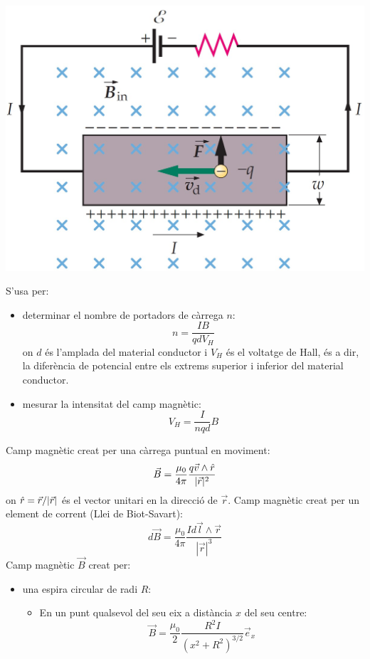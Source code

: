 \documentclass[../../../main.tex]{subfiles}
\begin{document}
\begin{multicols}{2}
\begin{minipage}{\linewidth}
\end{minipage}
\begin{minipage}{\linewidth}
    \centering
    \includegraphics[width=\linewidth]{Physics/1st/Electricity_and_magnetism/Images/hall-.jpg} 
\end{minipage}
S'usa per:
\begin{itemize}
    \item determinar el nombre de portadors de càrrega $n$: $$n=\frac{IB}{qdV_H}$$ {on $d$ és l'amplada del material conductor i $V_H$ és el voltatge de Hall, és a dir, la di\-fe\-rèn\-ci\-a de potencial entre els extrems superior i inferior del material conductor.}
    \item mesurar la intensitat del camp mag\-nè\-tic: $$V_H=\frac{I}{nqd}B$$
\end{itemize}
Camp magnètic creat per una càrrega puntual en moviment: $$\Vec{B}=\frac{\mu_0}{4\pi}\frac{q\Vec{v}\wedge\Hat{r}}{|\Vec{r}|^2}$$ {on $\Hat{r}=\Vec{r}/|\Vec{r}|$ és el vector unitari en la direcció de $\Vec{r}$.}\newline
Camp magnètic creat per un element de corrent (Llei de Biot-Savart): $$d\Vec{B}=\frac{\mu_0}{4\pi}\frac{Id\Vec{l}\wedge\Vec{r}}{|\Vec{r}|^3}$$
Camp magnètic $\Vec{B}$ creat per:
\begin{itemize}
    \item una espira circular de radi $R$:
    \begin{itemize}
        \item En un punt qualsevol del seu eix a distància $x$ del seu centre: $$\Vec{B}=\frac{\mu_0}{2}\frac{R^2I}{(x^2+R^2)^{3/2}}\Vec{e}_x$$

\end{itemize}
\end{itemize}
\end{multicols}
\end{document}
